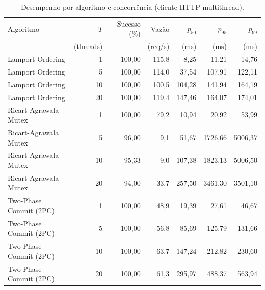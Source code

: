 \begin{table}[!t]
\centering
\caption{Desempenho por algoritmo e concorrência (cliente HTTP multithread).}
\label{tab:experiments}
\scriptsize
\setlength{\tabcolsep}{3pt}
\begin{tabular}{@{}l r r r r r r@{}}
\toprule
Algoritmo & $T$ & Sucesso (\%) & Vazão & $p_{50}$ & $p_{95}$ & $p_{99}$ \\
 & (threads) &  & (req/s) & (ms) & (ms) & (ms) \\
\midrule
Lamport Ordering & 1 & 100,00 & 115,8 & 8,25 & 11,21 & 14,76 \\
Lamport Ordering & 5 & 100,00 & 114,0 & 37,54 & 107,91 & 122,11 \\
Lamport Ordering & 10 & 100,00 & 100,5 & 104,28 & 141,94 & 164,19 \\
Lamport Ordering & 20 & 100,00 & 119,4 & 147,46 & 164,07 & 174,01 \\
Ricart-Agrawala Mutex & 1 & 100,00 & 79,2 & 10,94 & 20,92 & 53,99 \\
Ricart-Agrawala Mutex & 5 & 96,00 & 9,1 & 51,67 & 1726,66 & 5006,37 \\
Ricart-Agrawala Mutex & 10 & 95,33 & 9,0 & 107,38 & 1823,13 & 5006,50 \\
Ricart-Agrawala Mutex & 20 & 94,00 & 33,7 & 257,50 & 3461,30 & 3501,10 \\
Two-Phase Commit (2PC) & 1 & 100,00 & 48,9 & 19,39 & 27,61 & 46,67 \\
Two-Phase Commit (2PC) & 5 & 100,00 & 56,8 & 85,69 & 125,79 & 131,66 \\
Two-Phase Commit (2PC) & 10 & 100,00 & 63,7 & 147,24 & 212,82 & 230,60 \\
Two-Phase Commit (2PC) & 20 & 100,00 & 61,3 & 295,97 & 488,37 & 563,94 \\
\bottomrule
\end{tabular}
\end{table}
